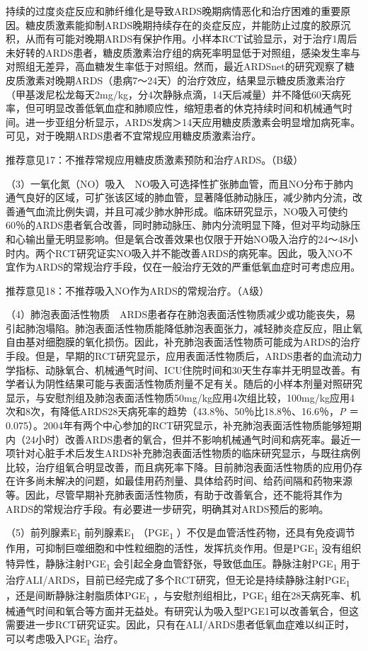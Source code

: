 持续的过度炎症反应和肺纤维化是导致ARDS晚期病情恶化和治疗困难的重要原因。糖皮质激素能抑制ARDS晚期持续存在的炎症反应，并能防止过度的胶原沉积，从而有可能对晚期ARDS有保护作用。小样本RCT试验显示，对于治疗1周后未好转的ARDS患者，糖皮质激素治疗组的病死率明显低于对照组，感染发生率与对照组无差异，高血糖发生率低于对照组。然而，最近ARDSnet的研究观察了糖皮质激素对晚期ARDS（患病7～24天）的治疗效应，结果显示糖皮质激素治疗（甲基泼尼松龙每天2mg/kg，分4次静脉点滴，14天后减量）并不降低60天病死率，但可明显改善低氧血症和肺顺应性，缩短患者的休克持续时间和机械通气时间。进一步亚组分析显示，ARDS发病＞14天应用糖皮质激素会明显增加病死率。可见，对于晚期ARDS患者不宜常规应用糖皮质激素治疗。

推荐意见17：不推荐常规应用糖皮质激素预防和治疗ARDS。（B级）

（3）一氧化氮（NO）吸入　NO吸入可选择性扩张肺血管，而且NO分布于肺内通气良好的区域，可扩张该区域的肺血管，显著降低肺动脉压，减少肺内分流，改善通气血流比例失调，并且可减少肺水肿形成。临床研究显示，NO吸入可使约60％的ARDS患者氧合改善，同时肺动脉压、肺内分流明显下降，但对平均动脉压和心输出量无明显影响。但是氧合改善效果也仅限于开始NO吸入治疗的24～48小时内。两个RCT研究证实NO吸入并不能改善ARDS的病死率。因此，吸入NO不宜作为ARDS的常规治疗手段，仅在一般治疗无效的严重低氧血症时可考虑应用。

推荐意见18：不推荐吸入NO作为ARDS的常规治疗。（A级）

（4）肺泡表面活性物质　ARDS患者存在肺泡表面活性物质减少或功能丧失，易引起肺泡塌陷。肺泡表面活性物质能降低肺泡表面张力，减轻肺炎症反应，阻止氧自由基对细胞膜的氧化损伤。因此，补充肺泡表面活性物质可能成为ARDS的治疗手段。但是，早期的RCT研究显示，应用表面活性物质后，ARDS患者的血流动力学指标、动脉氧合、机械通气时间、ICU住院时间和30天生存率并无明显改善。有学者认为阴性结果可能与表面活性物质剂量不足有关。随后的小样本剂量对照研究显示，与安慰剂组及肺泡表面活性物质50mg/kg应用4次组比较，100mg/kg应用4次和8次，有降低ARDS28天病死率的趋势（43.8％、50％比18.8％、16.6％，\emph{P}
＝0.075）。2004年有两个中心参加的RCT研究显示，补充肺泡表面活性物质能够短期内（24小时）改善ARDS患者的氧合，但并不影响机械通气时间和病死率。最近一项针对心脏手术后发生ARDS补充肺泡表面活性物质的临床研究显示，与既往病例比较，治疗组氧合明显改善，而且病死率下降。目前肺泡表面活性物质的应用仍存在许多尚未解决的问题，如最佳用药剂量、具体给药时间、给药间隔和药物来源等。因此，尽管早期补充肺表面活性物质，有助于改善氧合，还不能将其作为ARDS的常规治疗手段。有必要进一步研究，明确其对ARDS预后的影响。

（5）前列腺素E\textsubscript{1} 前列腺素E\textsubscript{1}
（PGE\textsubscript{1}
）不仅是血管活性药物，还具有免疫调节作用，可抑制巨噬细胞和中性粒细胞的活性，发挥抗炎作用。但是PGE\textsubscript{1}
没有组织特异性，静脉注射PGE\textsubscript{1}
会引起全身血管舒张，导致低血压。静脉注射PGE\textsubscript{1}
用于治疗ALI/ARDS，目前已经完成了多个RCT研究，但无论是持续静脉注射PGE\textsubscript{1}
，还是间断静脉注射脂质体PGE\textsubscript{1}
，与安慰剂组相比，PGE\textsubscript{1}
组在28天病死率、机械通气时间和氧合等方面并无益处。有研究认为吸入型PGE1可以改善氧合，但这需要进一步RCT研究证实。因此，只有在ALI/ARDS患者低氧血症难以纠正时，可以考虑吸入PGE\textsubscript{1}
治疗。

